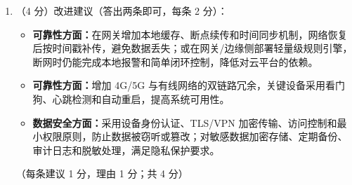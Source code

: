 \documentclass[a4paper,11pt]{article}
\begin{document}
\begin{enumerate}[start=29, label=\textbf{\arabic*.}, leftmargin=2.4em, itemsep=0.55em]
\begin{enumerate}[label=（\arabic*）, leftmargin=2.2em, itemsep=2pt]
  \item （4 分）改进建议（答出两条即可，每条 2 分）：
  \begin{itemize}[leftmargin=1.8em, itemsep=1pt]
    \item \textbf{可靠性方面：}在网关增加本地缓存、断点续传和时间同步机制，网络恢复后按时间戳补传，避免数据丢失；或在网关/边缘侧部署轻量级规则引擎，断网时仍能完成本地报警和简单闭环控制，降低对云平台的依赖。
    \item \textbf{可靠性方面：}增加 4G/5G 与有线网络的双链路冗余，关键设备采用看门狗、心跳检测和自动重启，提高系统可用性。
    \item \textbf{数据安全方面：}采用设备身份认证、TLS/VPN 加密传输、访问控制和最小权限原则，防止数据被窃听或篡改；对敏感数据加密存储、定期备份、审计日志和脱敏处理，满足隐私保护要求。
  \end{itemize}
  \hfill（每条建议 1 分，理由 1 分；共 4 分）
\end{enumerate}

\end{enumerate}
\end{document}

